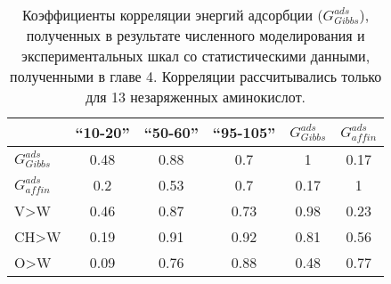 \begin{table}
\caption{\label{tab:comp_corr} Коэффициенты корреляции энергий адсорбции ($G_{Gibbs}^{ads}$), полученных в результате численного моделирования и экспериментальных шкал  со статистическими данными, полученными в главе 4. Корреляции рассчитывались только для 13 незаряженных аминокислот.}

	\begin{tabular}{l|ccc|cc}
	        & ``10-20'' & ``50-60'' & ``95-105''& $G_{Gibbs}^{ads}$ & $G_{affin}^{ads}$\\
	   \hline
$G_{Gibbs}^{ads}$ & 0.48  &  0.88  & 0.7 & 1 & 0.17\\
$G_{affin}^{ads}$&     0.2         &  0.53         &  0.7     & 0.17  & 1\\
V>W&0.46&0.87&0.73 & 0.98 & 0.23 \\
CH>W&0.19&0.91&0.92 & 0.81 & 0.56\\
O>W&0.09&0.76&0.88 & 0.48 & 0.77\\


\end{tabular}

	
\end{table}
	 